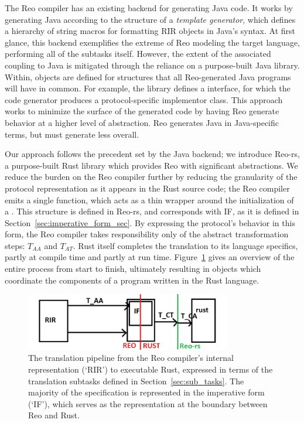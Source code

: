 The Reo compiler has an existing backend for generating Java code. It works by generating Java according to the structure of a \textit{template generator}, which defines a hierarchy of string macros for formatting RIR objects in Java's syntax. At first glance, this backend exemplifies the extreme of Reo modeling the target language, performing all of the subtasks itself. However, the extent of the associated coupling to Java is mitigated through the reliance on a purpose-built Java library. Within, objects are defined for structures that all Reo-generated Java programs will have in common. For example, the library defines a  interface, for which the code generator produces a protocol-specific implementor class. This approach works to minimize the surface of the generated code by having Reo generate behavior at a higher level of abstraction. Reo generates Java in Java-specific terms, but must generate less overall.

Our approach follows the precedent set by the Java backend; we introduce Reo-rs, a purpose-built Rust library which provides Reo with significant abstractions. We reduce the burden on the Reo compiler further by reducing the granularity of the protocol representation as it appears in the Rust source code; the Reo compiler emits a single  function, which acts as a thin wrapper around the initialization of a . This structure is defined in Reo-rs, and corresponds with IF, as it is defined in Section~\ref{sec:imperative_form_sec}. By expressing the protocol's behavior in this form, the Reo compiler takes responsibility only of the abstract transformation steps: $T_{AA}$ and $T_{AT}$. Rust itself completes the translation to its language specifics, partly at compile time and partly at run time. Figure~\ref{fig:pipeline} gives an overview of the entire process from start to finish, ultimately resulting in objects which coordinate the components of a program written in the Rust language.

\begin{figure}
	\centering
	\includegraphics[width=0.80\textwidth]{pipeline.png}
	\caption[TODO.]{The translation pipeline from the Reo compiler's internal representation (`RIR') to executable Rust, expressed in terms of the translation subtasks defined in Section~\ref{sec:sub_tasks}. The majority of the specification is represented in the imperative form (`IF'), which serves as the representation at the boundary between Reo and Rust.}
	\label{fig:pipeline}
\end{figure}

